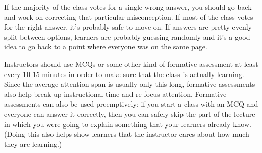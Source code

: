 If the majority of the class votes for a single wrong answer, you should
go back and work on correcting that particular misconception. If most of
the class votes for the right answer, it's probably safe to move on. If
answers are pretty evenly split between options, learners are probably
guessing randomly and it's a good idea to go back to a point where
everyone was on the same page.

Instructors should use MCQs or some other kind of formative assessment
at least every 10-15 minutes in order to make sure that the class is
actually learning. Since the average attention span is usually only this
long, formative assessments also help break up instructional time and
re-focus attention. Formative assessments can also be used preemptively:
if you start a class with an MCQ and everyone can answer it correctly,
then you can safely skip the part of the lecture in which you were going
to explain something that your learners already know. (Doing this also
helps show learners that the instructor cares about how much they are
learning.)

